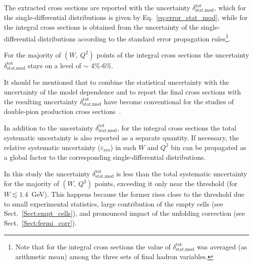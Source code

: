 The extracted cross sections are reported with the uncertainty $\delta_{\text{stat,mod}}^{\text{tot}}$, which for the single-differential distributions is given by Eq.~\eqref{eq:error_stat_mod}, while for the integral cross sections is obtained from the uncertainty of the single-differential distributions according to the standard error propagation rules\footnote[4]{Note that for the integral cross sections the value of $\delta_{\text{stat,mod}}^{\text{tot}}$ was averaged (as arithmetic mean) among the three sets of final hadron variables.}. 

For the majority of $(W,~Q^{2})$ points of the integral cross sections the uncertainty $\delta_{\text{stat,mod}}^{\text{tot}}$ stays on a level of $\sim$ 4\%-6\%.


It should be mentioned that to combine the statistical uncertainty with the uncertainty of the model dependence and to report the final cross sections with the resulting uncertainty $\delta_{\text{stat,mod}}^{\text{tot}}$ have become conventional for the studies of double-pion production cross sections~\cite{Rip_an_note:2002,Ripani:2002ss,Fed_an_note:2007,Fedotov:2008aa,Isupov:2017lnd,Arjun,Fed_an_note:2017,Fed_paper_2018}.



In addition to the uncertainty $\delta_{\text{stat,mod}}^{\text{tot}}$, for the integral cross sections the total systematic uncertainty is also reported as a separate quantity. If necessary, the relative systematic uncertainty ($\varepsilon_{\text{sys}}$) in each $W$ and $Q^{2}$ bin can be propagated as a global factor to the corresponding single-differential distributions.


In this study the uncertainty $\delta_{\text{stat,mod}}^{\text{tot}}$ is less than the total systematic uncertainty for the majority of $(W,~Q^{2})$ points, exceeding it only near the threshold (for $W \lesssim 1.4$~GeV). This happens because the former rises close to the threshold due to small experimental statistics, large contribution of the empty cells (see Sect.~\ref{Sect:empt_cells}), and pronounced impact of the unfolding correction (see Sect.~\ref{Sect:fermi_corr}).
